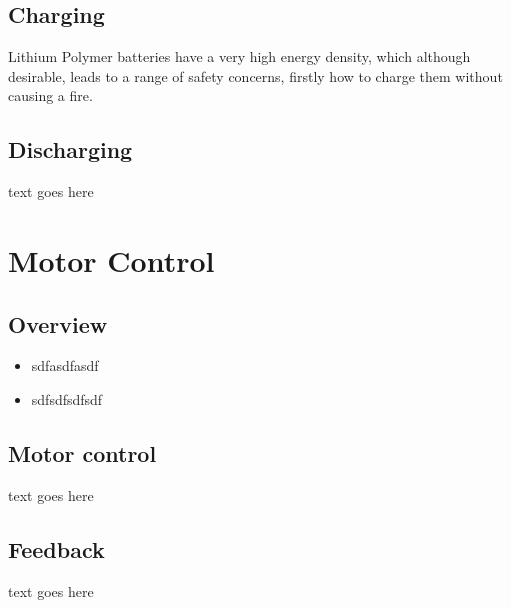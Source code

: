 \documentclass{article}
\begin{document}
	\subsection{Charging}
		Lithium Polymer batteries have a very high energy density, which although desirable, leads to a range of safety concerns, firstly how to charge them without causing a fire.
	\subsection{Discharging}
		text goes here
\section{Motor Control}
	\subsection{Overview}
		\begin{itemize}
			\item sdfasdfasdf
			\item sdfsdfsdfsdf
		\end{itemize}
	\subsection{Motor control}
		text goes here
	\subsection{Feedback}
		text goes here
\end{document}
